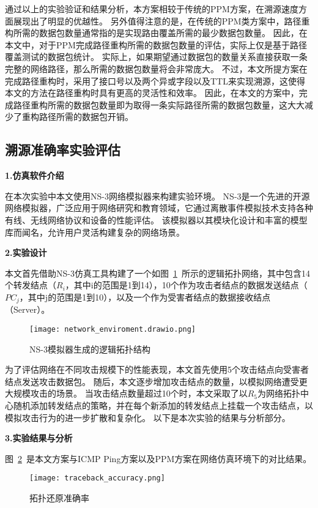 通过以上的实验验证和结果分析，本方案相较于传统的PPM方案，在溯源速度方面展现出了明显的优越性。
另外值得注意的是，在传统的PPM类方案中，路径重构所需的数据包数量通常指的是实现路由覆盖所需的最少数据包数量。
因此，在本文中，对于PPM完成路径重构所需的数据包数量的评估，实际上仅是基于路径覆盖测试的数据包统计。
实际上，如果期望通过数据包的数量关系直接获取一条完整的网络路径，那么所需的数据包数量将会非常庞大。
不过，本文所提方案在完成路径重构时，采用了接口号以及两个异或字段以及TTL来实现溯源，这使得本文的方法在路径重构时具有更高的灵活性和效率。
因此，在本文的方案中，完成路径重构所需的数据包数量即为取得一条实际路径所需的数据包数量，这大大减少了重构路径所需的数据包开销。
\subsection{溯源准确率实验评估}
\textbf{1.仿真软件介绍}\par
在本次实验中本文使用NS-3网络模拟器来构建实验环境。
NS-3是一个先进的开源网络模拟器，广泛应用于网络研究和教育领域，它通过离散事件模拟技术支持各种有线、无线网络协议和设备的性能评估。
该模拟器以其模块化设计和丰富的模型库而闻名，允许用户灵活构建复杂的网络场景。\par
\textbf{2.实验设计}\par
本文首先借助NS-3仿真工具构建了一个如图~\ref{fig:network_enviroment}~所示的逻辑拓扑网络，其中包含14个转发结点（$R_i$，其中i的范围是1到14），10个作为攻击者结点的数据发送结点（$PC_j$，其中j的范围是1到10），以及一个作为受害者结点的数据接收结点（Server）。
\begin{figure}[h]
	\centering
	\texttt{[image: network\_enviroment.drawio.png]}
	\caption{NS-3模拟器生成的逻辑拓扑结构}
	\label{fig:network_enviroment}
\end{figure}
为了评估网络在不同攻击规模下的性能表现，本文首先使用5个攻击结点向受害者结点发送攻击数据包。
随后，本文逐步增加攻击结点的数量，以模拟网络遭受更大规模攻击的场景。
当攻击结点数量超过10个时，本文采取了以$R_5$为网络拓扑中心随机添加转发结点的策略，并在每个新添加的转发结点上挂载一个攻击结点，以模拟攻击行为的进一步扩散和复杂化。
以下是本次实验的结果与分析部分。\par
\textbf{3.实验结果与分析}\par
图~\ref{fig:traceback_accuracy}~是本文方案与ICMP Ping方案以及PPM方案在网络仿真环境下的对比结果。
\begin{figure}[h]
	\centering
	\texttt{[image: traceback\_accuracy.png]}
	\caption{拓扑还原准确率}
	\label{fig:traceback_accuracy}
\end{figure}

